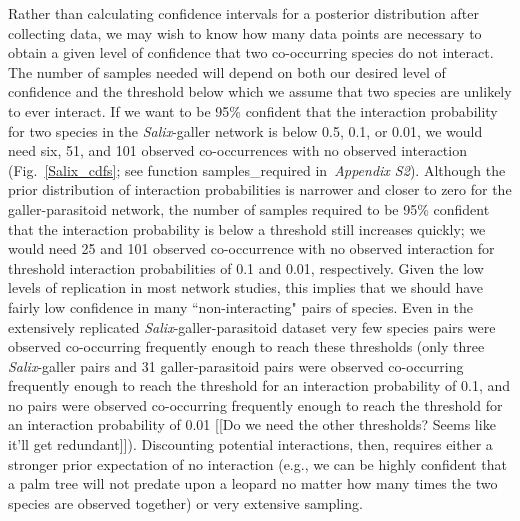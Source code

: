 \documentclass[12pt]{article}
\begin{document}
      Rather than calculating confidence intervals for a posterior distribution after collecting data, we may wish to know how many data points are necessary to obtain a given level of confidence that two co-occurring species do not interact. The number of samples needed will depend on both our desired level of confidence and the threshold below which we assume that two species are unlikely to ever interact. If we want to be 95\% confident that the interaction probability for two species in the \emph{Salix}-galler network is below 0.5, 0.1, or 0.01, we would need six, 51, and 101 observed co-occurrences with no observed interaction (Fig.~\ref{Salix_cdfs}; see function samples\_required in~\emph{Appendix S2}). Although the prior distribution of interaction probabilities is narrower and closer to zero for the galler-parasitoid network, the number of samples required to be 95\% confident that the interaction probability is below a threshold still increases quickly; we would need 25 and 101 observed co-occurrence with no observed interaction for threshold interaction probabilities of 0.1 and 0.01, respectively. Given the low levels of replication in most network studies, this implies that we should have fairly low confidence in many ``non-interacting" pairs of species. Even in the extensively replicated \emph{Salix}-galler-parasitoid dataset very few species pairs were observed co-occurring frequently enough to reach these thresholds (only three \emph{Salix}-galler pairs and 31 galler-parasitoid pairs were observed co-occurring frequently enough to reach the threshold for an interaction probability of 0.1, and no pairs were observed co-occurring frequently enough to reach the threshold for an interaction probability of 0.01 [[Do we need the other thresholds? Seems like it'll get redundant]]). Discounting potential interactions, then, requires either a stronger prior expectation of no interaction (e.g., we can be highly confident that a palm tree will not predate upon a leopard no matter how many times the two species are observed together) or very extensive sampling.
\end{document}
